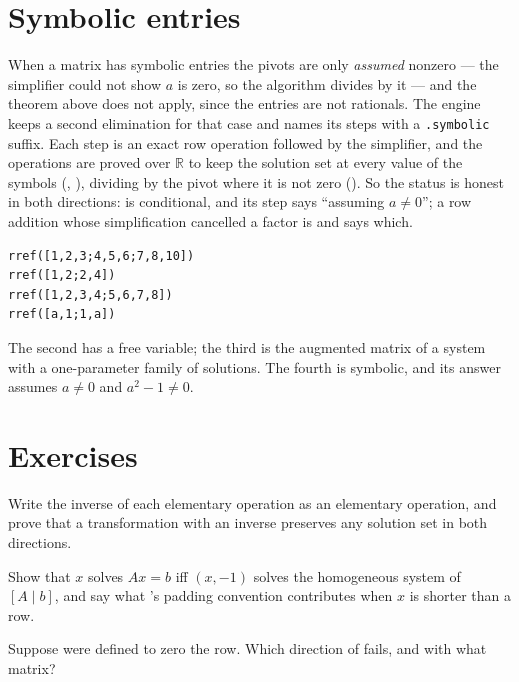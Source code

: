\section{Symbolic entries}

When a matrix has symbolic entries the pivots are only \emph{assumed} nonzero --- the simplifier
could not show $a$ is zero, so the algorithm divides by it --- and the theorem above does not
apply, since the entries are not rationals. The engine keeps a second elimination for that case
and names its steps with a \texttt{.symbolic} suffix. Each step is an exact row operation followed
by the simplifier, and the operations are proved over $\mathbb{R}$ to keep the solution set at every
value of the symbols (, ), dividing by the pivot where
it is not zero (). So the status is honest in both directions:
 is conditional, and its step says ``assuming $a \neq 0$''; a row addition
whose simplification cancelled a factor is  and says which.

\begin{trybox}
\begin{verbatim}
rref([1,2,3;4,5,6;7,8,10])
rref([1,2;2,4])
rref([1,2,3,4;5,6,7,8])
rref([a,1;1,a])
\end{verbatim}
  The second has a free variable; the third is the augmented matrix of a system with a
  one-parameter family of solutions. The fourth is symbolic, and its answer assumes
  $a \neq 0$ and $a^2 - 1 \neq 0$.
\end{trybox}

\section{Exercises}

\begin{exercisebox}[Invertibility]
  Write the inverse of each elementary operation as an elementary operation, and prove that a
  transformation with an inverse preserves any solution set in both directions.
\end{exercisebox}

\begin{exercisebox}
  Show that $x$ solves $Ax = b$ iff $(x, -1)$ solves the homogeneous system of $[A \mid b]$, and
  say what 's padding convention contributes when $x$ is shorter than a row.
\end{exercisebox}

\begin{exercisebox}
  Suppose  were defined to zero the row. Which direction of 
  fails, and with what matrix?
\end{exercisebox}

